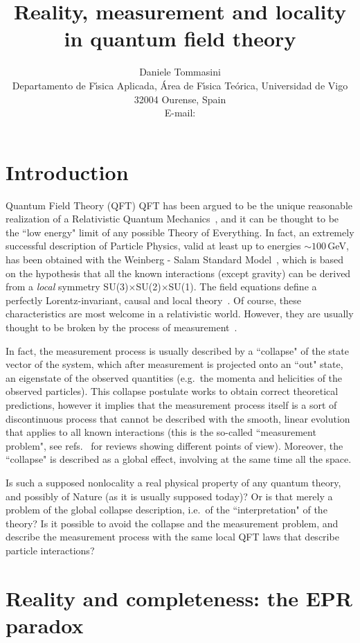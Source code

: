 \documentclass[published]{JHEP3}
\title{Reality, measurement and locality in quantum field theory}
\author{Daniele Tommasini\\ 
Departamento de F\'\i sica Aplicada,
\'Area de F\'\i sica Te\'orica, Universidad de Vigo\\ 
32004 Ourense, Spain\\ 
E-mail: \email{daniele@uvigo.es}}
\begin{document}
\section{Introduction} 

Quantum Field Theory (QFT) QFT has been argued to be the unique
reasonable realization of a Relativistic Quantum
Mechanics~\cite{WeinbookI}, and it can be thought to be the ``low
energy" limit of any possible Theory of Everything. In fact, an
extremely successful description of Particle Physics, valid at least
up to energies $\sim100$\,GeV, has been obtained with the Weinberg -
Salam Standard Model~\cite{WeinbookII}, which is based on the
hypothesis that all the known interactions (except gravity) can be
derived from a \emph{local} symmetry
SU(3)$\times$SU(2)$\times$SU(1). The field equations define a
perfectly Lorentz-invariant, causal and local
theory~\cite{WeinbookI,WeinbookII}. Of course, these characteristics
are most welcome in a relativistic world. However, they are usually
thought to be broken by the process of
measurement~\cite{measrel,measloca,Zeilinger,Laloe,Scarani}.

In fact, the measurement process is usually described by a ``collapse"
of the state vector of the system, which after measurement is
projected onto an ``out" state, an eigenstate of the observed
quantities (e.g.\ the momenta and helicities of the observed
particles). This collapse postulate works to obtain correct
theoretical predictions, however it implies that the measurement
process itself is a sort of discontinuous process that cannot be
described with the smooth, linear evolution that applies to all known
interactions (this is the so-called ``measurement problem", see
refs.~\cite{Ballentine70,Laloe} for reviews showing different points
of view). Moreover, the ``collapse" is described as a global effect,
involving at the same time all the space.

Is such a supposed nonlocality a real physical property of any quantum
theory, and possibly of Nature (as it is usually supposed today)? Or
is that merely a problem of the global collapse description, i.e.\ of
the ``interpretation" of the theory? Is it possible to avoid the
collapse and the measurement problem, and describe the measurement
process with the same local QFT laws that describe particle
interactions?


\section{Reality and completeness: the EPR paradox} 
\end{document}
